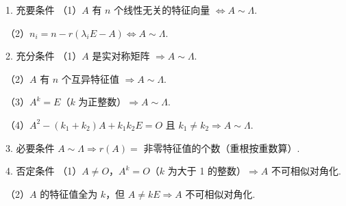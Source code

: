 

\begin{fcard}{1. 充要条件}
（1）$A$ 有 $n$ 个线性无关的特征向量 $\iff A\sim\Lambda$.

（2）$n_i=n-r(\lambda_i E-A)\iff A\sim\Lambda$.
\end{fcard}


\begin{fcard}{2. 充分条件}
（1）$A$ 是实对称矩阵 $\Rightarrow A\sim\Lambda$.

（2）$A$ 有 $n$ 个互异特征值 $\Rightarrow A\sim\Lambda$.

（3）$A^k=E$（$k$ 为正整数）$\Rightarrow A\sim\Lambda$.

（4）$A^2-(k_1+k_2)A+k_1k_2E=O$ 且 $k_1\ne k_2\Rightarrow A\sim\Lambda$.
\end{fcard}



\begin{fcard}{3. 必要条件}
$A\sim\Lambda\Rightarrow r(A)=$ 非零特征值的个数（重根按重数算）.
\end{fcard}


\begin{fcard}{4. 否定条件}
（1）$A\ne O$，$A^k=O$（$k$ 为大于 1 的整数）$\Rightarrow A$ 不可相似对角化.
\end{fcard}


（2）$A$ 的特征值全为 $k$，但 $A\ne kE\Rightarrow A$ 不可相似对角化.

